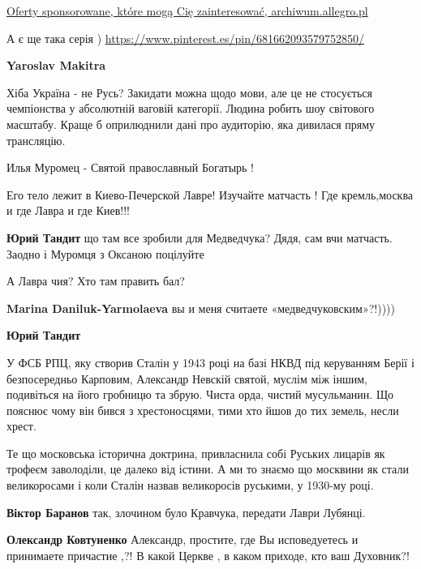 \begin{itemize}
\begin{itemize}
\href{https://archiwum.allegro.pl/oferta/czwarta-krucjata-michael-angold-i7511495750.html}{%
Oferty sponsorowane, które mogą Cię zainteresować, %
archiwum.allegro.pl%
}

А є ще така серія )
\url{https://www.pinterest.es/pin/681662093579752850/}

\textbf{Yaroslav Makitra} 

Хіба Україна - не Русь? Закидати можна щодо мови, але це не стосується
чемпіонства у абсолютній ваговій категорії. Людина робить шоу світового
масштабу. Краще б оприлюднили дані про аудиторію, яка дивилася пряму
трансляцію.

\end{itemize} %


Илья Муромец - Святой православный Богатырь !

Его тело лежит в Киево-Печерской Лавре! Изучайте матчасть ! Где кремль,москва и
где Лавра и где Киев!!!

\begin{itemize} %
\textbf{Юрий Тандит} що там все зробили для Медведчука? Дядя, сам вчи матчасть. Заодно і Муромця з Оксаною поцілуйте

А Лавра чия? Хто там править бал?

\textbf{Marina Daniluk-Yarmolaeva} вы и меня считаете «медведчуковским»?!))))

\textbf{Юрий Тандит} 

У ФСБ РПЦ, яку створив Сталін у 1943 році на базі НКВД під керуванням Берії і
безпосередньо Карповим, Александр Невскій святой, муслім між іншим, подивіться
на його гробницю та збрую. Чиста орда, чистий мусульманин. Що пояснює чому він
бився з хрестоносцями, тими хто йшов до тих земель, несли хрест.

Те що московська історична доктрина, привласнила собі Руських лицарів як
трофеєм заволоділи, це далеко від істини. А ми то знаємо що москвини як стали
великоросами і коли Сталін назвав великоросів руськими, у 1930-му році.


\textbf{Віктор Баранов} так, злочином було Кравчука, передати Лаври Лубянці.

\textbf{Олександр Ковтуненко} Александр, простите, где Вы исповедуетесь и принимаете причастие ,?!
В какой Церкве , в каком приходе, кто ваш Духовник?!


\end{itemize}
\end{itemize}
